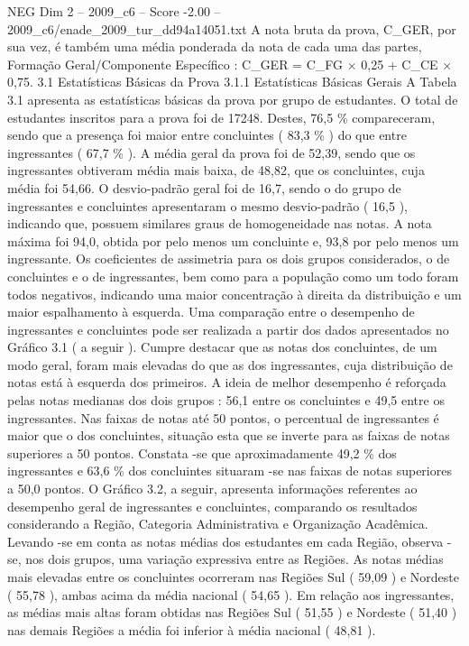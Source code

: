 \begin{textsample}{NEG Dim 2 – 2009\_c6 – Score -2.00 – 2009\_c6/enade\_2009\_tur\_dd94a14051.txt}
A nota bruta da prova, C\_GER, por sua vez, é também uma média ponderada da nota de cada uma das partes, Formação Geral/Componente Específico : C\_GER = C\_FG × 0,25 + C\_CE × 0,75. 3.1 Estatísticas Básicas da Prova 3.1.1 Estatísticas Básicas Gerais A Tabela 3.1 apresenta as estatísticas básicas da prova por grupo de estudantes.
O total de estudantes inscritos para a prova foi de 17248.
Destes, 76,5 \% compareceram, sendo que a presença foi maior entre concluintes ( 83,3 \% ) do que entre ingressantes ( 67,7 \% ).
A média geral da prova foi de 52,39, sendo que os ingressantes obtiveram média mais baixa, de 48,82, que os concluintes, cuja média foi 54,66.
O desvio-padrão geral foi de 16,7, sendo o do grupo de ingressantes e concluintes apresentaram o mesmo desvio-padrão ( 16,5 ), indicando que, possuem similares graus de homogeneidade nas notas.
A nota máxima foi 94,0, obtida por pelo menos um concluinte e, 93,8 por pelo menos um ingressante.
Os coeficientes de assimetria para os dois grupos considerados, o de concluintes e o de ingressantes, bem como para a população como um todo foram todos negativos, indicando uma maior concentração à direita da distribuição e um maior espalhamento à esquerda.
Uma comparação entre o desempenho de ingressantes e concluintes pode ser realizada a partir dos dados apresentados no Gráfico 3.1 ( a seguir ).
Cumpre destacar que as notas dos concluintes, de um modo geral, foram mais elevadas do que as dos ingressantes, cuja distribuição de notas está à esquerda dos primeiros.
A ideia de melhor desempenho é reforçada pelas notas medianas dos dois grupos : 56,1 entre os concluintes e 49,5 entre os ingressantes.
Nas faixas de notas até 50 pontos, o percentual de ingressantes é maior que o dos concluintes, situação esta que se inverte para as faixas de notas superiores a 50 pontos.
Constata -se que aproximadamente 49,2 \% dos ingressantes e 63,6 \% dos concluintes situaram -se nas faixas de notas superiores a 50,0 pontos.
O Gráfico 3.2, a seguir, apresenta informações referentes ao desempenho geral de ingressantes e concluintes, comparando os resultados considerando a Região, Categoria Administrativa e Organização Acadêmica.
Levando -se em conta as notas médias dos estudantes em cada Região, observa -se, nos dois grupos, uma variação expressiva entre as Regiões.
As notas médias mais elevadas entre os concluintes ocorreram nas Regiões Sul ( 59,09 ) e Nordeste ( 55,78 ), ambas acima da média nacional ( 54,65 ).
Em relação aos ingressantes, as médias mais altas foram obtidas nas Regiões Sul ( 51,55 ) e Nordeste ( 51,40 ) nas demais Regiões a média foi inferior à média nacional ( 48,81 ).

\end{textsample}
